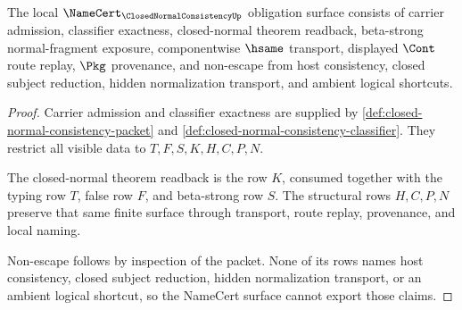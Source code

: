 \begin{theorem}
\label{thm:closed-normal-consistency-namecert-obligation-surface}
The local $\NameCert_{\ClosedNormalConsistencyUp}$ obligation surface consists of carrier admission, classifier exactness, closed-normal theorem readback, beta-strong normal-fragment exposure, componentwise $\hsame$ transport, displayed $\Cont$ route replay, $\Pkg$ provenance, and non-escape from host consistency, closed subject reduction, hidden normalization transport, and ambient logical shortcuts.
\end{theorem}
\begin{proof}
Carrier admission and classifier exactness are supplied by \autoref{def:closed-normal-consistency-packet} and \autoref{def:closed-normal-consistency-classifier}. They restrict all visible data to $T,F,S,K,H,C,P,N$.

The closed-normal theorem readback is the row $K$, consumed together with the typing row $T$, false row $F$, and beta-strong row $S$. The structural rows $H,C,P,N$ preserve that same finite surface through transport, route replay, provenance, and local naming.

Non-escape follows by inspection of the packet. None of its rows names host consistency, closed subject reduction, hidden normalization transport, or an ambient logical shortcut, so the NameCert surface cannot export those claims.
\end{proof}

